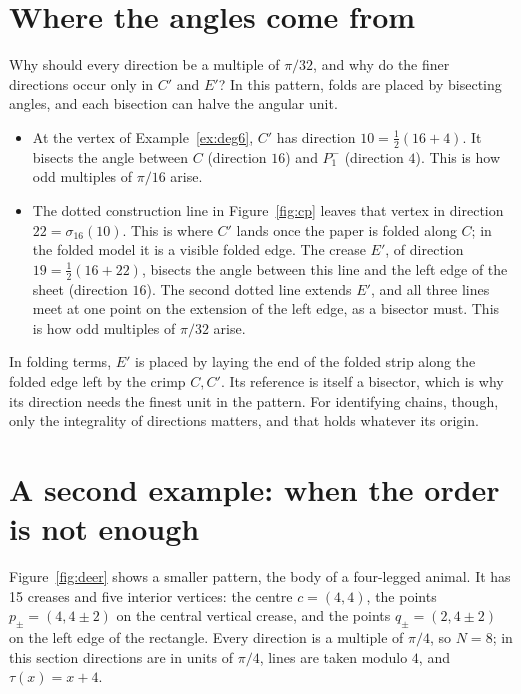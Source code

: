 \documentclass[11pt]{article}
\theoremstyle{definition}
\theoremstyle{remark}
\begin{document}
\section{Where the angles come from}\label{sec:angles}

Why should every direction be a multiple of $\pi/32$, and why do the finer directions occur only in $C'$ and $E'$? In this pattern, folds are placed by bisecting angles, and each bisection can halve the angular unit.
\begin{itemize}
\item At the vertex of Example~\ref{ex:deg6}, $C'$ has direction $10=\tfrac12(16+4)$. It bisects the angle between $C$ (direction $16$) and $P_1^{-}$ (direction $4$). This is how odd multiples of $\pi/16$ arise.
\item The dotted construction line in Figure~\ref{fig:cp} leaves that vertex in direction $22=\sigma_{16}(10)$. This is where $C'$ lands once the paper is folded along $C$; in the folded model it is a visible folded edge. The crease $E'$, of direction $19=\tfrac12(16+22)$, bisects the angle between this line and the left edge of the sheet (direction $16$). The second dotted line extends $E'$, and all three lines meet at one point on the extension of the left edge, as a bisector must. This is how odd multiples of $\pi/32$ arise.
\end{itemize}
In folding terms, $E'$ is placed by laying the end of the folded strip along the folded edge left by the crimp $C,C'$. Its reference is itself a bisector, which is why its direction needs the finest unit in the pattern. For identifying chains, though, only the integrality of directions matters, and that holds whatever its origin.

\section{A second example: when the order is not enough}\label{sec:deer}

Figure~\ref{fig:deer} shows a smaller pattern, the body of a four-legged animal. It has 15 creases and five interior vertices: the centre $c=(4,4)$, the points $p_\pm=(4,4\pm2)$ on the central vertical crease, and the points $q_\pm=(2,4\pm2)$ on the left edge of the rectangle. Every direction is a multiple of $\pi/4$, so $N=8$; in this section directions are in units of $\pi/4$, lines are taken modulo $4$, and $\tau(x)=x+4$.
\end{document}
